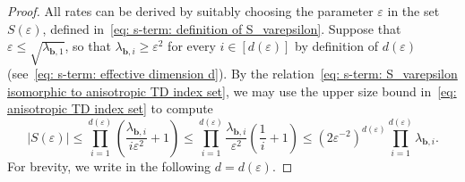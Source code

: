 \documentclass[10pt,a4paper]{amsart}
\newcommand{\abs}[1]{\left|#1\right|}
\begin{document}
\begin{proof}
    All rates can be derived by suitably choosing the parameter \(\varepsilon\) in the set \(S(\varepsilon)\), defined in~\eqref{eq: s-term: definition of S_varepsilon}.
    Suppose that \( \varepsilon \leq \sqrt{\lambda_{\bm{b}, 1}} \), so that \(\lambda_{\bm{b}, i} \geq \varepsilon^2\) for every \(i \in [d(\varepsilon)]\) by definition of \(d(\varepsilon)\) (see~\eqref{eq: s-term: effective dimension d}). By the relation~\eqref{eq: s-term: S_varepsilon isomorphic to anisotropic TD index set}, we may use the upper size bound in~\eqref{eq: anisotropic TD index set} to compute
    \begin{equation}
    \label{eq: upper size bound for S_varepsilon}
        \abs{S(\varepsilon)} \leq \prod_{i=1}^{d(\varepsilon)} \left(\frac{\lambda_{\bm{b},i}}{i \varepsilon^2} + 1\right) 
        \leq \prod_{i=1}^{d(\varepsilon)} \frac{\lambda_{\bm{b},i}}{\varepsilon^2} \left(\frac{1}{i} + 1\right) 
        \leq (2 \varepsilon^{-2})^{d(\varepsilon)} \prod_{i=1}^{d(\varepsilon)} \lambda_{\bm{b},i}.
    \end{equation}
    For brevity, we write in the following \(d = d(\varepsilon)\).



\end{proof}
\end{document}
